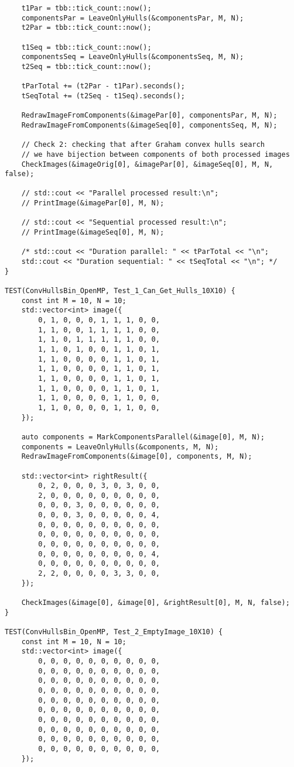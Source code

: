 \documentclass[14pt, russian]{extarticle}
\begin{document}
\begin{lstlisting}
	t1Par = tbb::tick_count::now();
	componentsPar = LeaveOnlyHulls(&componentsPar, M, N);
	t2Par = tbb::tick_count::now();
	
	t1Seq = tbb::tick_count::now();
	componentsSeq = LeaveOnlyHulls(&componentsSeq, M, N);
	t2Seq = tbb::tick_count::now();
	
	tParTotal += (t2Par - t1Par).seconds();
	tSeqTotal += (t2Seq - t1Seq).seconds();
	
	RedrawImageFromComponents(&imagePar[0], componentsPar, M, N);
	RedrawImageFromComponents(&imageSeq[0], componentsSeq, M, N);
	
	// Check 2: checking that after Graham convex hulls search
	// we have bijection between components of both processed images
	CheckImages(&imageOrig[0], &imagePar[0], &imageSeq[0], M, N, false);
	
	// std::cout << "Parallel processed result:\n";
	// PrintImage(&imagePar[0], M, N);
	
	// std::cout << "Sequential processed result:\n";
	// PrintImage(&imageSeq[0], M, N);
	
	/* std::cout << "Duration parallel: " << tParTotal << "\n";
	std::cout << "Duration sequential: " << tSeqTotal << "\n"; */
}

TEST(ConvHullsBin_OpenMP, Test_1_Can_Get_Hulls_10X10) {
	const int M = 10, N = 10;
	std::vector<int> image({
		0, 1, 0, 0, 0, 1, 1, 1, 0, 0,
		1, 1, 0, 0, 1, 1, 1, 1, 0, 0,
		1, 1, 0, 1, 1, 1, 1, 1, 0, 0,
		1, 1, 0, 1, 0, 0, 1, 1, 0, 1,
		1, 1, 0, 0, 0, 0, 1, 1, 0, 1,
		1, 1, 0, 0, 0, 0, 1, 1, 0, 1,
		1, 1, 0, 0, 0, 0, 1, 1, 0, 1,
		1, 1, 0, 0, 0, 0, 1, 1, 0, 1,
		1, 1, 0, 0, 0, 0, 1, 1, 0, 0,
		1, 1, 0, 0, 0, 0, 1, 1, 0, 0,
	});
	
	auto components = MarkComponentsParallel(&image[0], M, N);
	components = LeaveOnlyHulls(&components, M, N);
	RedrawImageFromComponents(&image[0], components, M, N);
	
	std::vector<int> rightResult({
		0, 2, 0, 0, 0, 3, 0, 3, 0, 0,
		2, 0, 0, 0, 0, 0, 0, 0, 0, 0,
		0, 0, 0, 3, 0, 0, 0, 0, 0, 0,
		0, 0, 0, 3, 0, 0, 0, 0, 0, 4,
		0, 0, 0, 0, 0, 0, 0, 0, 0, 0,
		0, 0, 0, 0, 0, 0, 0, 0, 0, 0,
		0, 0, 0, 0, 0, 0, 0, 0, 0, 0,
		0, 0, 0, 0, 0, 0, 0, 0, 0, 4,
		0, 0, 0, 0, 0, 0, 0, 0, 0, 0,
		2, 2, 0, 0, 0, 0, 3, 3, 0, 0,
	});
	
	CheckImages(&image[0], &image[0], &rightResult[0], M, N, false);
}

TEST(ConvHullsBin_OpenMP, Test_2_EmptyImage_10X10) {
	const int M = 10, N = 10;
	std::vector<int> image({
		0, 0, 0, 0, 0, 0, 0, 0, 0, 0,
		0, 0, 0, 0, 0, 0, 0, 0, 0, 0,
		0, 0, 0, 0, 0, 0, 0, 0, 0, 0,
		0, 0, 0, 0, 0, 0, 0, 0, 0, 0,
		0, 0, 0, 0, 0, 0, 0, 0, 0, 0,
		0, 0, 0, 0, 0, 0, 0, 0, 0, 0,
		0, 0, 0, 0, 0, 0, 0, 0, 0, 0,
		0, 0, 0, 0, 0, 0, 0, 0, 0, 0,
		0, 0, 0, 0, 0, 0, 0, 0, 0, 0,
		0, 0, 0, 0, 0, 0, 0, 0, 0, 0,
	});
	

\end{lstlisting}
\end{document}
